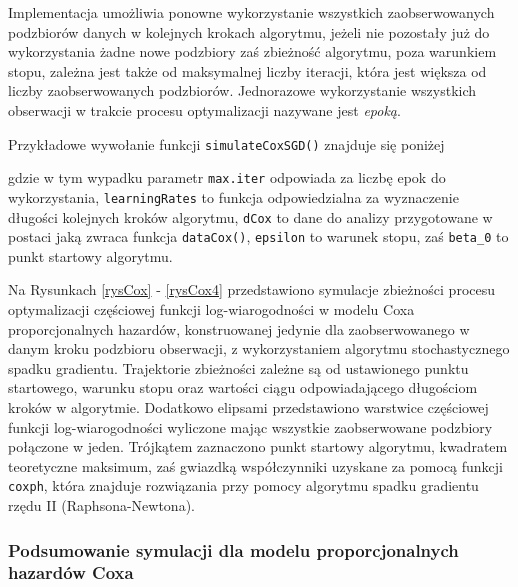 Implementacja umożliwia ponowne wykorzystanie wszystkich zaobserwowanych podzbiorów danych w kolejnych krokach algorytmu, jeżeli nie pozostały już do wykorzystania żadne nowe podzbiory zaś zbieżność algorytmu, poza warunkiem stopu, zależna jest także od maksymalnej liczby iteracji, która jest większa od liczby zaobserwowanych podzbiorów. Jednorazowe wykorzystanie wszystkich obserwacji w trakcie procesu optymalizacji nazywane jest \textit{epoką}. 

Przykładowe wywołanie funkcji \texttt{simulateCoxSGD()} znajduje się poniżej

\begin{Shaded}
\begin{Highlighting}[]
 \NormalTok{/(}\NormalTok{*}
                \NormalTok{, } \NormalTok{, } \NormalTok{(}\NormalTok{,}\NormalTok{))}
\end{Highlighting}
\end{Shaded}
gdzie w tym wypadku parametr \texttt{max.iter} odpowiada za liczbę epok do wykorzystania, \texttt{learningRates} to funkcja odpowiedzialna za wyznaczenie długości kolejnych kroków algorytmu, \texttt{dCox} to dane do analizy przygotowane w postaci jaką zwraca funkcja \texttt{dataCox()}, \texttt{epsilon} to warunek stopu, zaś \texttt{beta\_0} to punkt startowy algorytmu.

Na Rysunkach \ref{rysCox} - \ref{rysCox4} przedstawiono symulacje zbieżności procesu optymalizacji częściowej funkcji log-wiarogodności w modelu Coxa proporcjonalnych hazardów, konstruowanej jedynie dla zaobserwowanego w danym kroku podzbioru obserwacji, z wykorzystaniem algorytmu stochastycznego spadku gradientu. Trajektorie zbieżności zależne są od ustawionego punktu startowego, warunku stopu oraz wartości ciągu odpowiadającego długościom kroków w algorytmie. Dodatkowo elipsami przedstawiono warstwice częściowej funkcji log-wiarogodności wyliczone mając wszystkie zaobserwowane podzbiory połączone w jeden. Trójkątem zaznaczono punkt startowy algorytmu, kwadratem teoretyczne maksimum, zaś gwiazdką współczynniki uzyskane za pomocą funkcji \texttt{coxph}, która znajduje rozwiązania przy pomocy algorytmu spadku gradientu rzędu II (Raphsona-Newtona).

\newpage
\subsubsection{Podsumowanie symulacji dla modelu proporcjonalnych hazardów Coxa}

